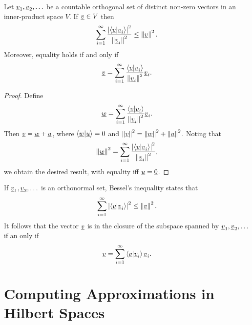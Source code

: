 \begin{corollary}
Let $\underline{v}_1, \underline{v}_2, \ldots$ be a countable orthogonal set of distinct non-zero vectors in an inner-product space $V$.
If $\underline{v} \in V$ then
\begin{equation*}
\sum_{i=1}^\infty \frac{ \left| \left\langle \underline{v} | \underline{v}_i \right\rangle \right|^2 }{ \left\| \underline{v}_i \right\|^2 }
\leq \left\| \underline{v} \right\|^2.
\end{equation*}
Moreover, equality holds if and only if
\begin{equation*}
\underline{v} = \sum_{i=1}^\infty \frac{ \left\langle \underline{v} | \underline{v}_i \right\rangle }{ \left\| \underline{v}_i \right\|^2 } \underline{v}_i.
\end{equation*}
\end{corollary}
\begin{proof}
Define
\begin{equation*}
\underline{w} = \sum_{i=1}^\infty \frac{ \left\langle \underline{v} | \underline{v}_i \right\rangle }{ \left\| \underline{v}_i \right\|^2 } \underline{v}_i.
\end{equation*}
Then $\underline{v} = \underline{w} + \underline{u}$, where $\left\langle \underline{w} | \underline{u} \right\rangle = 0$ and $\left\| \underline{v} \right\|^2 = \left\| \underline{w} \right\|^2 + \left\| \underline{u} \right\|^2$.
Noting that
\begin{equation*}
\left\| \underline{w} \right\|^2
= \sum_{i=1}^\infty \frac{ \left| \left\langle \underline{v} | \underline{v}_i \right\rangle \right|^2 }{ \left\| \underline{v}_i \right\|^2 },
\end{equation*}
we obtain the desired result, with equality iff $\underline{u} = \underline{0}$.
\end{proof}

If $\underline{v}_1, \underline{v}_2, \ldots$ is an orthonormal set, Bessel's inequality states that
\begin{equation*}
\sum_{i=1}^\infty \left| \left\langle \underline{v} | \underline{v}_i \right\rangle \right|^2 \leq \left\| \underline{v} \right\|^2.
\end{equation*}
It follows that the vector $\underline{v}$ is in the closure of the subspace spanned by $\underline{v}_1, \underline{v}_2, \ldots$ if an only if
\begin{equation*}
\underline{v} = \sum_{i=1}^\infty \left\langle \underline{v} | \underline{v}_i \right\rangle \underline{v}_i.
\end{equation*}


\section{Computing Approximations in Hilbert Spaces}

